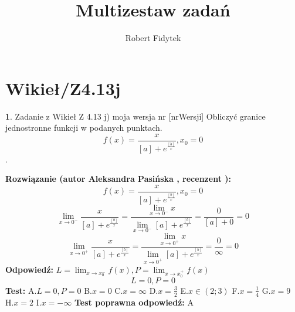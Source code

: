 \documentclass[12pt, a4paper]{article}
\title{Multizestaw zadań}
\author{Robert Fidytek}
\date{}
\theoremstyle{definition} %
\newtheorem{zad}{}
\newcommand{\kategoria}[1]{\section{#1}} %
\newcommand{\zadStart}[1]{\begin{zad}#1\newline} %
\newcommand{\zadStop}{\end{zad}}   %
\newcommand{\rozwStart}[2]{\noindent \textbf{Rozwiązanie (autor #1 , recenzent #2): }\newline} %
\newcommand{\rozwStop}{\newline}                                            %
\newcommand{\odpStart}{\noindent \textbf{Odpowiedź:}\newline}    %
\newcommand{\odpStop}{\newline}                                             %
\newcommand{\testStart}{\noindent \textbf{Test:}\newline} %
\newcommand{\testStop}{\newline} %
\newcommand{\kluczStart}{\noindent \textbf{Test poprawna odpowiedź:}\newline} %
\newcommand{\kluczStop}{\newline} %
\begin{document}
\maketitle


\kategoria{Wikieł/Z4.13j}
\zadStart{Zadanie z Wikieł Z 4.13 j) moja wersja nr [nrWersji]}
Obliczyć granice jednostronne funkcji w podanych punktach. $$f(x)=\frac{x}{[a]+e^{\frac{[b]}{x}}},x_{0}=0$$.
\zadStop
\rozwStart{Aleksandra Pasińska}{}
$$f(x)=\frac{x}{[a]+e^{\frac{[b]}{x}}},x_{0}=0$$
$$\lim_{x\rightarrow 0^-}\frac{x}{[a]+e^{\frac{[b]}{x}}}=\frac{\lim_{x\rightarrow 0^-}x}{\lim_{x\rightarrow 0^-}[a]+e^{\frac{[b]}{x}}}=\frac{0}{[a]+0}=0$$ 
$$\lim_{x\rightarrow 0^+}\frac{x}{[a]+e^{\frac{[b]}{x}}}=\frac{\lim_{x\rightarrow 0^+}x}{\lim_{x\rightarrow 0^+}[a]+e^{\frac{[b]}{x}}}=\frac{0}{\infty}=0$$ 
\rozwStop
\odpStart
$ L=\lim_{x\rightarrow x_{0}^-}f(x), P=\lim_{x\rightarrow x_{0}^+}f(x)$
$$L=0, P=0$$
\odpStop
\testStart
A.$ L=0, P=0 $
B.$x=0$
C.$x=\infty$
D.$x=\frac{3}{2}$
E.$x\in (2;3)$
F.$x=\frac{1}{4}$
G.$x=9$
H.$x=2$
I.$x=-\infty$
\testStop
\kluczStart
A
\kluczStop
\end{document}
